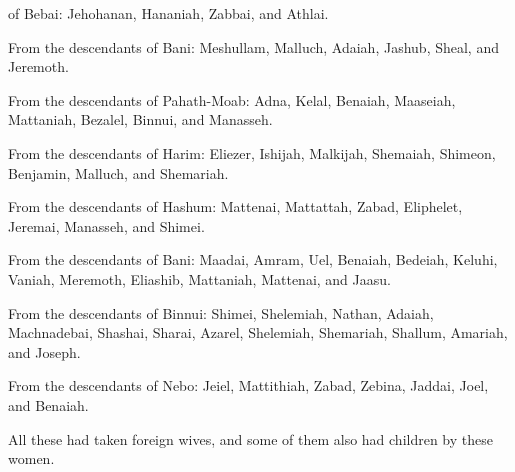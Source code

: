 {of Bebai: Jehohanan,
Hananiah,
Zabbai,
and Athlai.
\par }{\PP {}From the descendants
of Bani: Meshullam,
Malluch,
Adaiah,
Jashub,
Sheal,
and Jeremoth.
\par }{\PP {}From the descendants
of Pahath-Moab: Adna,
Kelal,
Benaiah,
Maaseiah,
Mattaniah,
Bezalel,
Binnui,
and Manasseh.
\par }{\PP {}From the descendants
of Harim: Eliezer,
Ishijah,
Malkijah,
Shemaiah,
Shimeon,
Benjamin,
Malluch,
and Shemariah.
\par }{\PP {}From the descendants
of Hashum: Mattenai,
Mattattah,
Zabad,
Eliphelet,
Jeremai,
Manasseh,
and Shimei.
\par }{\PP {}From the descendants
of Bani: Maadai,
Amram,
Uel,
Benaiah,
Bedeiah,
Keluhi,
Vaniah,
Meremoth,
Eliashib,
Mattaniah,
Mattenai,
and Jaasu.
\par }{\PP {}From the descendants
of Binnui: Shimei,
Shelemiah,
Nathan,
Adaiah,
Machnadebai,
Shashai,
Sharai,
Azarel,
Shelemiah,
Shemariah,
Shallum,
Amariah,
and Joseph.
\par }{\PP {}From the descendants
of Nebo: Jeiel,
Mattithiah,
Zabad,
Zebina,
Jaddai,
Joel,
and Benaiah.
\par }{\PP {}All
these
had taken
foreign
wives,
and some
of them
also had children
by these women.
\par }